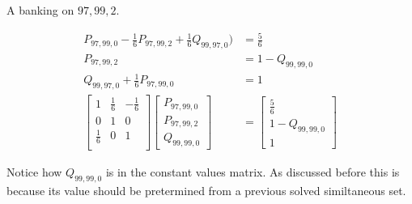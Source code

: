 \documentclass[a4paper,titlepage]{article}
\begin{document}
A banking on $97,99,2$.

\begin{align*}
	P_{97,99,0} - \frac{1}{6}P_{97,99,2} + \frac{1}{6}Q_{99,97,0}) &= \frac{5}{6}\\
	P_{97,99,2}                                                    &= 1 - Q_{99,99,0}\\
	Q_{99,97,0} + \frac{1}{6}P_{97,99,0}                           &= 1\\
	\begin{bmatrix}
		1           & \frac{1}{6} & -\frac{1}{6}\\
		0           & 1           & 0\\
		\frac{1}{6} & 0           & 1\\
	\end{bmatrix}
	\begin{bmatrix}
		P_{97,99,0}\\
		P_{97,99,2}\\
		Q_{99,99,0}
	\end{bmatrix}
	& =
	\begin{bmatrix}
		\frac{5}{6}\\
		1 - Q_{99,99,0}\\
		1
	\end{bmatrix}
\end{align*}

Notice how $Q_{99,99,0}$ is in the constant values matrix. As discussed before this is because its value should be pretermined from a previous solved similtaneous set.
\end{document}

